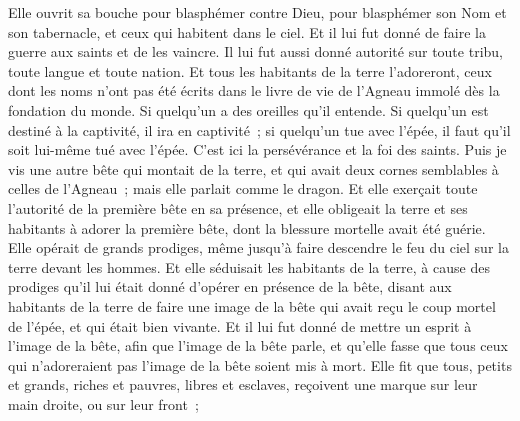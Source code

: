 \begin{multicols}{2}
Elle ouvrit sa bouche pour blasphémer contre Dieu, pour blasphémer son Nom et son tabernacle, et ceux qui habitent dans le ciel.
Et il lui fut donné de faire la guerre aux saints et de les vaincre. Il lui fut aussi donné autorité sur toute tribu, toute langue et toute nation.
Et tous les habitants de la terre l'adoreront, ceux dont les noms n'ont pas été écrits dans le livre de vie de l'Agneau immolé dès la fondation du monde.
Si quelqu'un a des oreilles qu'il entende.
Si quelqu'un est destiné à la captivité, il ira en captivité~; si quelqu'un tue avec l'épée, il faut qu'il soit lui-même tué avec l'épée. C'est ici la persévérance et la foi des saints.
Puis je vis une autre bête qui montait de la terre, et qui avait deux cornes semblables à celles de l'Agneau~; mais elle parlait comme le dragon.
Et elle exerçait toute l'autorité de la première bête en sa présence, et elle obligeait la terre et ses habitants à adorer la première bête, dont la blessure mortelle avait été guérie.
Elle opérait de grands prodiges, même jusqu'à faire descendre le feu du ciel sur la terre devant les hommes.
Et elle séduisait les habitants de la terre, à cause des prodiges qu'il lui était donné d'opérer en présence de la bête, disant aux habitants de la terre de faire une image de la bête qui avait reçu le coup mortel de l'épée, et qui était bien vivante.
Et il lui fut donné de mettre un esprit à l'image de la bête, afin que l'image de la bête parle, et qu'elle fasse que tous ceux qui n'adoreraient pas l'image de la bête soient mis à mort.
Elle fit que tous, petits et grands, riches et pauvres, libres et esclaves, reçoivent une marque sur leur main droite, ou sur leur front~;

\end{multicols}
